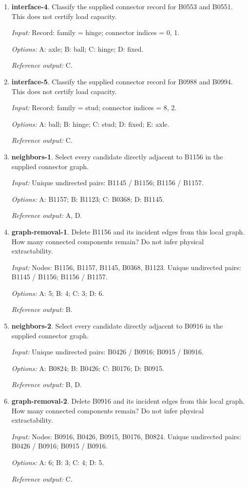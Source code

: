 \begin{enumerate}
\item \textbf{interface-4}. Classify the supplied connector record for B0553 and B0551. This does not certify load capacity.\par {\small \textit{Input:} Record: family = hinge; connector indices = 0, 1. \par\textit{Options:} A: axle; B: ball; C: hinge; D: fixed. \par\textit{Reference output:} C.}
\item \textbf{interface-5}. Classify the supplied connector record for B0988 and B0994. This does not certify load capacity.\par {\small \textit{Input:} Record: family = stud; connector indices = 8, 2. \par\textit{Options:} A: ball; B: hinge; C: stud; D: fixed; E: axle. \par\textit{Reference output:} C.}
\item \textbf{neighbors-1}. Select every candidate directly adjacent to B1156 in the supplied connector graph.\par {\small \textit{Input:} Unique undirected pairs: B1145 / B1156; B1156 / B1157. \par\textit{Options:} A: B1157; B: B1123; C: B0368; D: B1145. \par\textit{Reference output:} A, D.}
\item \textbf{graph-removal-1}. Delete B1156 and its incident edges from this local graph. How many connected components remain? Do not infer physical extractability.\par {\small \textit{Input:} Nodes: B1156, B1157, B1145, B0368, B1123. Unique undirected pairs: B1145 / B1156; B1156 / B1157. \par\textit{Options:} A: 5; B: 4; C: 3; D: 6. \par\textit{Reference output:} B.}
\item \textbf{neighbors-2}. Select every candidate directly adjacent to B0916 in the supplied connector graph.\par {\small \textit{Input:} Unique undirected pairs: B0426 / B0916; B0915 / B0916. \par\textit{Options:} A: B0824; B: B0426; C: B0176; D: B0915. \par\textit{Reference output:} B, D.}
\item \textbf{graph-removal-2}. Delete B0916 and its incident edges from this local graph. How many connected components remain? Do not infer physical extractability.\par {\small \textit{Input:} Nodes: B0916, B0426, B0915, B0176, B0824. Unique undirected pairs: B0426 / B0916; B0915 / B0916. \par\textit{Options:} A: 6; B: 3; C: 4; D: 5. \par\textit{Reference output:} C.}

\end{enumerate}
